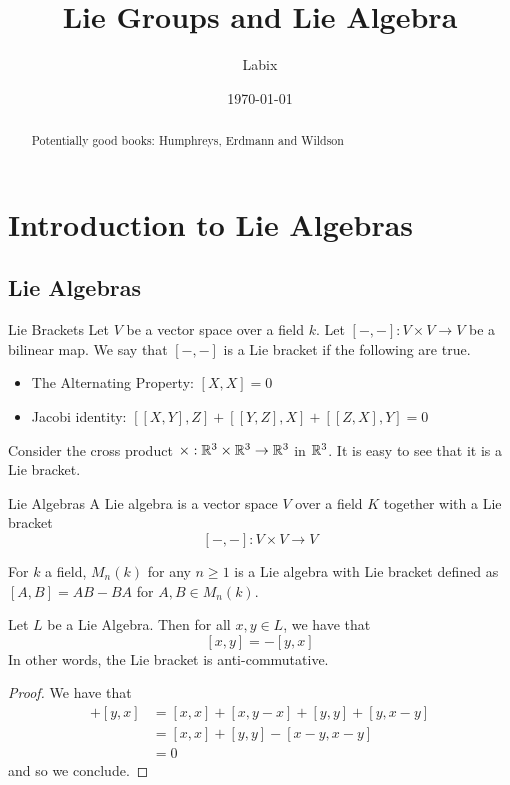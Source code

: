 \documentclass[a4paper]{article}
\title{Lie Groups and Lie Algebra}
\author{Labix}
\date{\today}
\begin{document}
\maketitle
\begin{abstract}
Potentially good books: Humphreys, Erdmann and Wildson
\end{abstract}
\pagebreak
\tableofcontents
\pagebreak

\section{Introduction to Lie Algebras}
\subsection{Lie Algebras}
\begin{defn}{Lie Brackets}{} Let $V$ be a vector space over a field $k$. Let $[-,-]:V\times V\to V$ be a bilinear map. We say that $[-,-]$ is a Lie bracket if the following are true. 
\begin{itemize}
\item The Alternating Property: $[X,X]=0$
\item Jacobi identity: $[[X,Y],Z]+[[Y,Z],X]+[[Z,X],Y]=0$
\end{itemize}
\end{defn}

Consider the cross product $\times:\mathbb{R}^3\times\mathbb{R}^3\to\mathbb{R}^3$ in $\mathbb{R}^3$. It is easy to see that it is a Lie bracket. 

\begin{defn}{Lie Algebras}{} A Lie algebra is a vector space $V$ over a field $K$ together with a Lie bracket $$[-,-]:V\times V\to V$$
\end{defn}

For $k$ a field, $M_n(k)$ for any $n\geq 1$ is a Lie algebra with Lie bracket defined as $[A,B]=AB-BA$ for $A,B\in M_n(k)$. 

\begin{lmm}{}{} Let $L$ be a Lie Algebra. Then for all $x,y\in L$, we have that $$[x,y]=-[y,x]$$ In other words, the Lie bracket is anti-commutative. \tcbline
\begin{proof}
We have that 
\begin{align*}
[x,y]+[y,x]&=[x,x]+[x,y-x]+[y,y]+[y,x-y]\tag{Bilinearity}\\
&=[x,x]+[y,y]-[x-y,x-y]\tag{Bilinearity}\\
&=0\tag{Alternating}
\end{align*}
and so we conclude. 
\end{proof}
\end{lmm}
\end{document}
